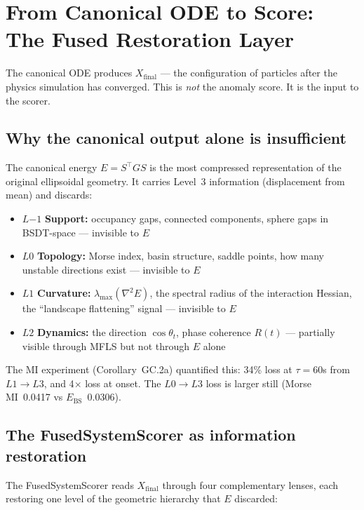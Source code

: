 \documentclass[11pt,a4paper]{article}
\theoremstyle{definition}
\begin{document}
\newpage
\section{From Canonical ODE to Score: The Fused Restoration Layer}
\label{sec:fused_restoration}

\noindent
The canonical ODE produces $X_\text{final}$ --- the configuration of particles
after the physics simulation has converged.
This is \emph{not} the anomaly score.
It is the input to the scorer.

\subsection{Why the canonical output alone is insufficient}

The canonical energy $E = S^\top GS$ is the most compressed representation
of the original ellipsoidal geometry.
It carries Level~3 information (displacement from mean) and discards:

\begin{itemize}
\item $L{-1}$ \textbf{Support:} occupancy gaps, connected components,
  sphere gaps in BSDT-space --- invisible to $E$
\item $L0$ \textbf{Topology:} Morse index, basin structure, saddle points,
  how many unstable directions exist --- invisible to $E$
\item $L1$ \textbf{Curvature:} $\lambda_\text{max}(\nabla^2 E)$,
  the spectral radius of the interaction Hessian,
  the ``landscape flattening'' signal --- invisible to $E$
\item $L2$ \textbf{Dynamics:} the direction $\cos\theta_t$, phase coherence $R(t)$
  --- partially visible through MFLS but not through $E$ alone
\end{itemize}

The MI experiment (Corollary~GC.2a) quantified this:
34\% loss at $\tau=60$s from $L1 \to L3$, and 4$\times$ loss at onset.
The $L0 \to L3$ loss is larger still (Morse MI~0.0417 vs $E_\text{BS}$~0.0306).

\subsection{The FusedSystemScorer as information restoration}

The FusedSystemScorer reads $X_\text{final}$ through four complementary lenses,
each restoring one level of the geometric hierarchy that $E$ discarded:
\end{document}
